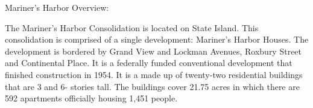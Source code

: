 Mariner's Harbor Overview:        

      

The Mariner's Harbor Consolidation is located on State Island. This consolidation is comprised of a single development: Mariner's Harbor Houses. The development is bordered by Grand View and Lockman Avenues, Roxbury Street and Continental Place. It is a federally funded conventional development that finished construction in 1954. It is a made up of twenty-two residential buildings that are 3 and 6- stories tall. The buildings cover 21.75 acres in which there are 592 apartments officially housing 1,451 people.    